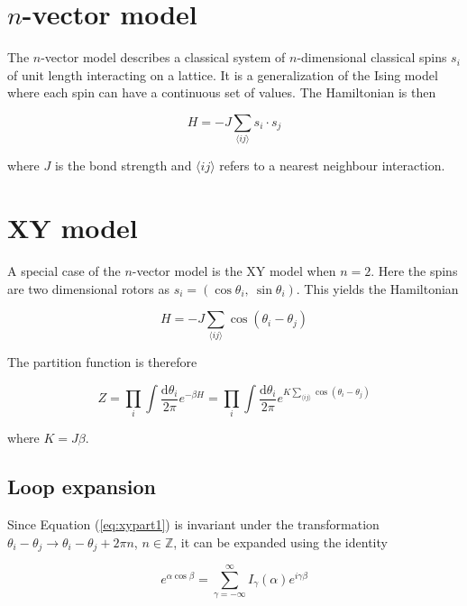 \section{$n$-vector model}
\label{sec:nVector}

The $n$-vector model describes a classical system of $n$-dimensional classical spins $s_i$ of unit length interacting on a lattice. It is a generalization of the Ising model where each spin can have a continuous set of values. The Hamiltonian is then

\begin{equation}
    H = -J\sum_{\langle ij \rangle} s_i \cdot s_j
\end{equation}

where $J$ is the bond strength and $\langle ij \rangle$ refers to a nearest neighbour interaction.

\section{XY model}
\label{sec:XYModel}

A special case of the $n$-vector model is the XY model when $n = 2$. Here the spins are two dimensional rotors as $s_i = (\cos \theta_i, \  \sin \theta_i)$. This yields the Hamiltonian

\begin{equation}
    H = - J \sum_{\langle ij \rangle} \cos(\theta_i - \theta_j)
\label{eq:xymodel}
\end{equation}

The partition function is therefore

\begin{equation}
    Z = \prod_i \int \frac{\mathrm d \theta_i}{2 \pi} e^{-\beta H} = \prod_i \int \frac{\mathrm d \theta_i}{2 \pi} e^{K \sum_{\langle ij \rangle} \cos(\theta_i - \theta_j)}
\label{eq:xypart1}
\end{equation}

where $K = J \beta$.

\subsection{Loop expansion}
\label{subsec:XYLoopexp}

Since Equation (\ref{eq:xypart1}) is invariant under the transformation $\theta_i - \theta_j \rightarrow \theta_i - \theta_j + 2 \pi n$, $n \in \mathbb{Z}$, it can be expanded using the identity

\begin{equation}
    e^{\alpha \cos \beta} = \sum_{\gamma = -\infty}^{\infty} I_\gamma ( \alpha ) e^{i \gamma \beta}
\end{equation}

